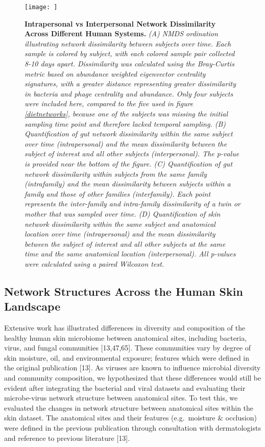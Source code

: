 \documentclass[12pt,]{article}
\begin{document}
\begin{figure}[htbp]
\centering
\texttt{[image: ]}
\caption{\textbf{Intrapersonal vs Interpersonal Network Dissimilarity
Across Different Human Systems.} \emph{(A) NMDS ordination illustrating
network dissimilarity between subjects over time. Each sample is colored
by subject, with each colored sample pair collected 8-10 days apart.
Dissimilarity was calculated using the Bray-Curtis metric based on
abundance weighted eigenvector centrality signatures, with a greater
distance representing greater dissimilarity in bacteria and phage
centrality and abundance. Only four subjects were included here,
compared to the five used in figure \ref{dietnetworks}, because one of
the subjects was missing the initial sampling time point and therefore
lacked temporal sampling. (B) Quantification of gut network
dissimilarity within the same subject over time (intrapersonal) and the
mean dissimilarity between the subject of interest and all other
subjects (interpersonal). The p-value is provided near the bottom of the
figure. (C) Quantification of gut network dissimilarity within subjects
from the same family (intrafamily) and the mean dissimilarity between
subjects within a family and those of other families (interfamily). Each
point represents the inter-family and intra-family dissimilarity of a
twin or mother that was sampled over time. (D) Quantification of skin
network dissimilarity within the same subject and anatomical location
over time (intrapersonal) and the mean dissimilarity between the subject
of interest and all other subjects at the same time and the same
anatomical location (interpersonal). All p-values were calculated using
a paired Wilcoxon test.}\label{intradiv}}
\end{figure}

\subsection{Network Structures Across the Human Skin
Landscape}\label{network-structures-across-the-human-skin-landscape}

Extensive work has illustrated differences in diversity and composition
of the healthy human skin microbiome between anatomical sites, including
bacteria, virus, and fungal communities {[}13,47,65{]}. These
communities vary by degree of skin moisture, oil, and environmental
exposure; features which were defined in the original publication
{[}13{]}. As viruses are known to influence microbial diversity and
community composition, we hypothesized that these differences would
still be evident after integrating the bacterial and viral datasets and
evaluating their microbe-virus network structure between anatomical
sites. To test this, we evaluated the changes in network structure
between anatomical sites within the skin dataset. The anatomical sites
and their features (e.g.~moisture \& occlusion) were defined in the
previous publication through consultation with dermatologists and
reference to previous literature {[}13{]}.
\end{document}
